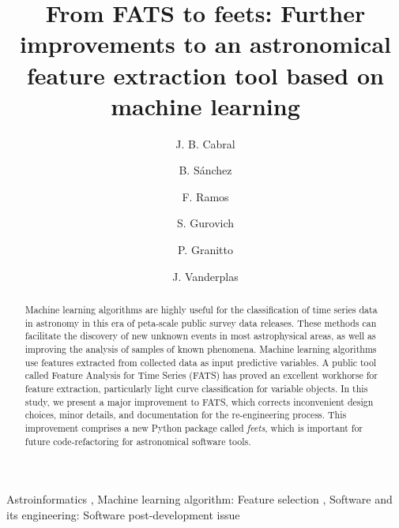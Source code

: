 \documentclass[final,5p,times,twocolumn,authoryear]{elsarticle}
\begin{document}
\begin{frontmatter}

\title{From FATS to feets: Further improvements to an astronomical 
       feature extraction tool based on machine learning}

  \author[iate,fceia]{J. B. Cabral}
  \author[iate,famaf]{B. S\'anchez}
  \author[iate]{F. Ramos}
  \author[iate]{S. Gurovich}
  \author[cifasis]{P. Granitto}
  \author[escience]{J. Vanderplas}
  
\address[iate]{
   Instituto De Astronom\'ia Te\'orica y Experimental -
   Observatorio Astron\'omico C\'ordoba (IATE--OAC--UNC--CONICET),
   Laprida 854, X5000BGR, C\'ordoba, Argentina}
\address[fceia]{
   Facultad de Ciencias Exactas, Ingenier\'{i}a y Agrimensura, UNR,
   Pellegrini 250 - S2000BTP, Rosario, Argentina}
\address[cifasis]{
   Centro Internacional Franco Argentino de Ciencias de la
   Informaci\'on y de Sistemas (CIFASIS, CONICET--UNR),
   Ocampo y Esmeralda, S2000EZP,
   Rosario, Argentina}
\address[escience]{
 	University of Washington eScience Institute,
    Campus Box 351570,
    University of Washington,
	Seattle, WA 98195-1570}
\address[famaf]{
	Facultad de Matem\'atica, Astronom\'{\i}a y F\'{\i}sica
    Universidad Nacional de C\'ordoba (FaMAF--UNC)
	Bvd. Medina Allende s/n, Ciudad Universitaria,
    X5000BGR, C\'ordoba, Argentina 
}


\begin{abstract}
Machine learning algorithms are highly useful for the classification of time series 
data in astronomy in this era of 
peta-scale public survey data releases.
%
These methods can facilitate the discovery of new unknown events in most astrophysical 
areas, as well as improving the analysis of samples of known phenomena.
%
Machine learning algorithms use features extracted from collected data as input predictive variables.
%
A public tool called Feature Analysis for Time Series (FATS) has proved 
an excellent workhorse for feature extraction, particularly light curve 
classification for variable objects. 
%
In this study, we present a major improvement to FATS, which 
corrects inconvenient design choices, minor details, and
documentation for the re-engineering process.
%
This improvement comprises a new Python package  called \textit{feets}, which is important 
for future code-refactoring for astronomical software tools.
\end{abstract}


\begin{keyword}
   Astroinformatics \sep 
   Machine learning algorithm: Feature selection \sep
Software and its engineering: Software post-development issue 
   
\end{keyword}

\end{frontmatter}
\end{document}
